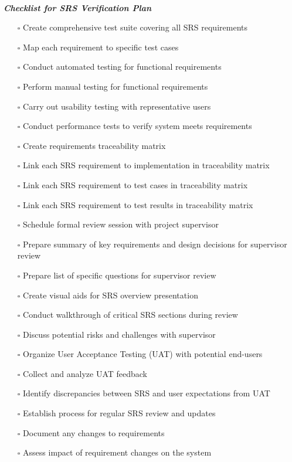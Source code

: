 \documentclass[12pt, titlepage]{article}
\begin{document}
\textbf{\textit{\\Checklist for SRS Verification Plan}}
\begin{itemize}
  \item[$\square$] Create comprehensive test suite covering all SRS requirements
  \item[$\square$] Map each requirement to specific test cases
  \item[$\square$] Conduct automated testing for functional requirements
  \item[$\square$] Perform manual testing for functional requirements
  \item[$\square$] Carry out usability testing with representative users
  \item[$\square$] Conduct performance tests to verify system meets requirements
  \item[$\square$] Create requirements traceability matrix
  \item[$\square$] Link each SRS requirement to implementation in
    traceability matrix
  \item[$\square$] Link each SRS requirement to test cases in
    traceability matrix
  \item[$\square$] Link each SRS requirement to test results in
    traceability matrix
  \item[$\square$] Schedule formal review session with project supervisor
  \item[$\square$] Prepare summary of key requirements and design
    decisions for supervisor review
  \item[$\square$] Prepare list of specific questions for supervisor review
  \item[$\square$] Create visual aids for SRS overview presentation
  \item[$\square$] Conduct walkthrough of critical SRS sections during review
  \item[$\square$] Discuss potential risks and challenges with supervisor
  \item[$\square$] Organize User Acceptance Testing (UAT) with
    potential end-users
  \item[$\square$] Collect and analyze UAT feedback
  \item[$\square$] Identify discrepancies between SRS and user
    expectations from UAT
  \item[$\square$] Establish process for regular SRS review and updates
  \item[$\square$] Document any changes to requirements
  \item[$\square$] Assess impact of requirement changes on the system
\end{itemize}
\end{document}
